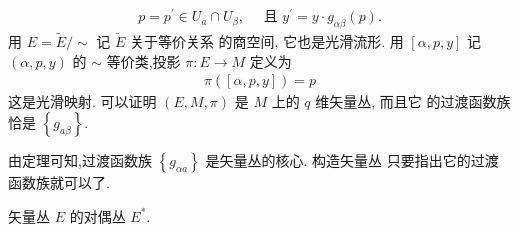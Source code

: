 \begin{align*}
    p=p^{\prime} \in U_a \cap U_\beta, \quad \text { 且 } y^{\prime}=y \cdot g_{\alpha \beta}(p) .
    \end{align*}
    用 $E=\widetilde{E} / \sim$ 记 $\widetilde{E}$ 关于等价关系 的商空间, 它也是光滑流形. 用 $[\alpha, p, y]$ 记 $(\alpha, p, y)$ 的 $\sim$ 等价类,投影 $\pi: E \rightarrow M$ 定义为
    \begin{align*}
    \pi([\alpha, p, y])=p
    \end{align*}
    这是光滑映射. 可以证明 $(E, M, \pi)$ 是 $M$ 上的 $q$ 维矢量丛, 而且它 的过渡函数族恰是 $\left\{g_{a \beta}\right\}$.

    由定理可知,过渡函数族 $\left\{g_{\alpha a}\right\}$ 是矢量丛的核心. 构造矢量丛 只要指出它的过渡函数族就可以了.
\begin{example}[][例 1 ]
    矢量丛 $E$ 的对偶丛 $E^*$.
\end{example}
